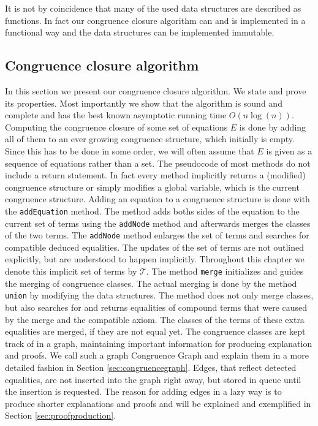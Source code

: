 It is not by coincidence that many of the used data structures are described as functions.
In fact our congruence closure algorithm can and is implemented in a functional way and the data structures can be implemented immutable.

\FloatBarrier

\subsection*{Congruence closure algorithm}
\label{sec:congruenceclosurealgorithm}
In this section we present our congruence closure algorithm.
We state and prove its properties.
Most importantly we show that the algorithm is sound and complete and has the best known asymptotic running time $O(n \log(n))$.
Computing the congruence closure of some set of equations $E$ is done by adding all of them to an ever growing congruence structure, which initially is empty.
Since this has to be done in some order, we will often assume that $E$ is given as a sequence of equations rather than a set.
The pseudocode of most methods do not include a return statement.
In fact every method implicitly returns a (modified) congruence structure or simply modifies a global variable, which is the current congruence structure.
Adding an equation to a congruence structure is done with the \texttt{addEquation} method.
The method adds boths sides of the equation to the current set of terms using the \texttt{addNode} method and afterwards merges the classes of the two terms.
The \texttt{addNode} method enlarges the set of terms and searches for compatible deduced equalities.
The updates of the set of terms are not outlined explicitly, but are understood to happen implicitly.
Throughout this chapter we denote this implicit set of terms by $\mathcal{T}$.
The method \texttt{merge} initializes and guides the merging of congruence classes.
The actual merging is done by the method \texttt{union} by modifying the data structures.
The method does not only merge classes, but also searches for and returns equalities of compound terms that were caused by the merge and the compatible axiom.
The classes of the terms of these extra equalities are merged, if they are not equal yet.
The congruence classes are kept track of in a graph, maintaining important information for producing explanation and proofs.
We call such a graph Congruence Graph and explain them in a more detailed fashion in Section \ref{sec:congruencegraph}.
Edges, that reflect detected equalities, are not inserted into the graph right away, but stored in queue until the insertion is requested.
The reason for adding edges in a lazy way is to produce shorter explanations and proofs and will be explained and exemplified in Section \ref{sec:proofproduction}.

